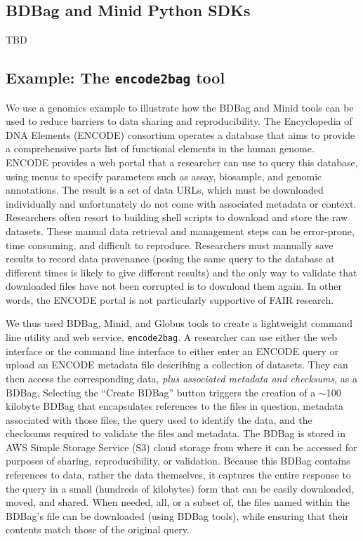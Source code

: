 \documentclass[11pt]{article}
\begin{document}
\subsection{BDBag and Minid Python SDKs} 

TBD


\subsection{Example: The \texttt{encode2bag} tool}

We use a genomics example to illustrate how the BDBag and Minid tools can be used to reduce
barriers to data sharing and reproducibility.
The Encyclopedia of DNA Elements (ENCODE) consortium operates a database that aims to provide a
comprehensive parts list of functional elements in the human genome.
ENCODE provides a web portal that a researcher can use to query this database,
using menus to specify parameters such as assay, biosample, and genomic annotations.
The result is a set of data URLs,
which must be downloaded individually and unfortunately do not come with associated metadata or context.
Researchers often resort to building shell scripts to download and store the raw datasets.
These manual data retrieval and management steps can be error-prone,
time consuming, and difficult to reproduce.
Researchers must manually save results to record data provenance (posing the same query to the database at different
times is likely to give different results)
and the only way to validate that downloaded files have not been corrupted is to download them again.
In other words, the ENCODE portal is not particularly supportive of FAIR research.

We thus used BDBag, Minid, and Globus tools to create a lightweight command line utility and web service, \texttt{encode2bag}.
A researcher can use either the web interface or the command line interface to
either enter an ENCODE query or upload an ENCODE metadata file describing a collection of datasets.
They can then access the corresponding data, \emph{plus associated metadata and checksums}, as a BDBag.
Selecting the ``Create BDBag'' button triggers the creation of a $\sim$100 kilobyte BDBag that encapsulates references to the files in question, metadata associated with those files, the query used to identify the data, and the checksums required to validate the files and metadata.
The BDBag is stored in AWS Simple Storage Service (S3) cloud storage from where it can be accessed for purposes of sharing, reproducibility, or validation.
Because this BDBag contains references to data, rather the data themselves, it captures the entire response to the query in a small (hundreds of kilobytes) form that can be easily downloaded, moved, and shared.
When needed, all, or a subset of, the files named within the BDBag's  file can be downloaded
(using BDBag tools), while ensuring that their contents match those of the original query.
\end{document}
